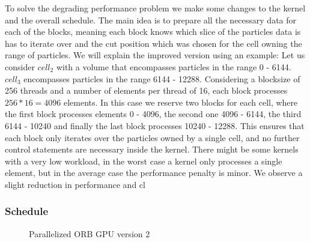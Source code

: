 \documentclass[]{article}
\begin{document}
To solve the degrading performance problem we make some changes to the kernel and the overall schedule. The main idea is to prepare all the necessary data for each of the blocks, meaning each block knows which slice of the particles data is has to iterate over and the cut position which was chosen for the cell owning the range of particles. 
We will explain the improved version using an example: Let us consider $cell_2$ with a volume that encompasses particles in the range 0 - 6144. $cell_3$ encompasses particles in the range 6144 - 12288. Considering a blocksize of 256 threads and a number of elements per thread of 16, each block processes $256 * 16 = 4096$ elements. In this case we reserve two blocks for each cell, where the first block processes elements 0 - 4096, the second one 4096 - 6144, the third 6144 - 10240 and finally the last block processes 10240 - 12288. This ensures that each block only iterates over the particles owned by a single cell, and no further control statements are necessary inside the kernel. There might be some kernels with a very low workload, in the worst case a kernel only processes a single element, but in the average case the performance penalty is minor. We observe a slight reduction in performance and cl	

\subsubsection{Schedule}

\begin{figure}[H]
	\begin{center}
	\end{center}
	\caption{Parallelized ORB GPU version 2}
	\label{fig:orbgpup2}
\end{figure}
\end{document}

